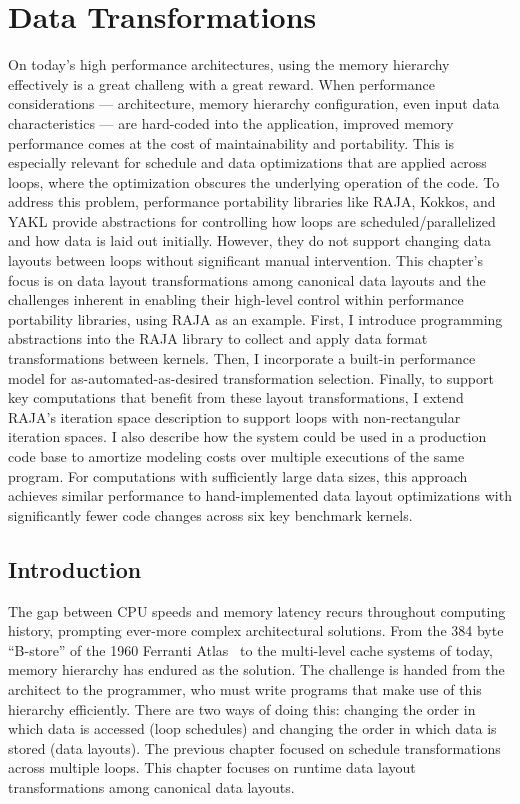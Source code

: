 \chapter{Data Transformations}\label{chap:FormatDecisions}

On today's high performance architectures, using the memory hierarchy effectively is a great challeng with a great reward.
When performance considerations --- architecture, memory hierarchy configuration, even input data characteristics --- are hard-coded into the application, improved memory performance comes at the cost of maintainability and portability.
This is especially relevant for schedule and data optimizations that are applied across loops, where the optimization obscures the underlying operation of the code.
To address this problem, performance portability libraries like RAJA, Kokkos, and YAKL provide abstractions for controlling how loops are scheduled/parallelized and how data is laid out initially. 
However, they do not support changing data layouts between loops without significant manual intervention.
This chapter's focus is on data layout transformations among canonical data layouts and the challenges inherent in enabling their high-level control within performance portability libraries, using RAJA as an example.
First, I introduce programming abstractions into the RAJA library to collect and apply data format transformations between kernels.
Then, I incorporate a built-in performance model for as-automated-as-desired transformation selection. 
Finally, to support key computations that benefit from these layout transformations, I extend RAJA's iteration space description to support loops with non-rectangular iteration spaces.
I also describe how the system could be used in a production code base to amortize modeling costs over multiple executions of the same program.
For computations with sufficiently large data sizes, this approach achieves similar performance to hand-implemented data layout optimizations with significantly fewer code changes across six key benchmark kernels.

\section{Introduction}

The gap between CPU speeds and memory latency recurs throughout computing history, prompting ever-more complex architectural solutions.
From the 384 byte ``B-store'' of the 1960 Ferranti Atlas~\cite{ferranti1960features} to the multi-level cache systems of today, memory hierarchy has endured as the solution.
The challenge is handed from the architect to the programmer, who must write programs that make use of this hierarchy efficiently.
There are two ways of doing this: changing the order in which data is accessed (loop schedules) and changing the order in which data is stored (data layouts).
The previous chapter focused on schedule transformations across multiple loops. 
This chapter focuses on runtime data layout transformations among canonical data layouts.

